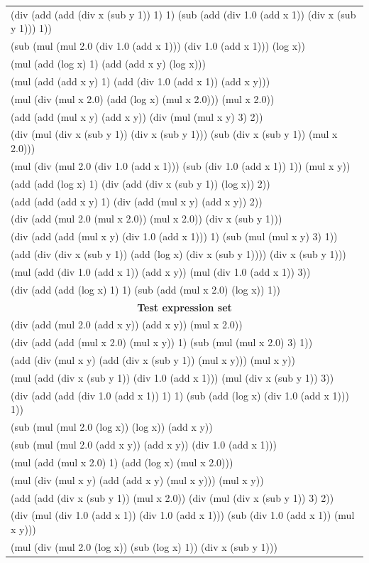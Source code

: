 \documentclass[fullpage,twocolumn]{article} %
\begin{document}
\begin{table}
\begin{tabular}{l}
(div (add (add (div x (sub y 1)) 1) 1) (sub (add (div 1.0 (add x 1)) (div x (sub y 1))) 1))  \\
(sub (mul (mul 2.0 (div 1.0 (add x 1))) (div 1.0 (add x 1))) (log x))  \\
(mul (add (log x) 1) (add (add x y) (log x)))  \\
(mul (add (add x y) 1) (add (div 1.0 (add x 1)) (add x y)))  \\
(mul (div (mul x 2.0) (add (log x) (mul x 2.0))) (mul x 2.0))  \\
(add (add (mul x y) (add x y)) (div (mul (mul x y) 3) 2))  \\
(div (mul (div x (sub y 1)) (div x (sub y 1))) (sub (div x (sub y 1)) (mul x 2.0)))  \\
(mul (div (mul 2.0 (div 1.0 (add x 1))) (sub (div 1.0 (add x 1)) 1)) (mul x y))  \\
(add (add (log x) 1) (div (add (div x (sub y 1)) (log x)) 2))  \\
(add (add (add x y) 1) (div (add (mul x y) (add x y)) 2))  \\
(div (add (mul 2.0 (mul x 2.0)) (mul x 2.0)) (div x (sub y 1)))  \\
(div (add (add (mul x y) (div 1.0 (add x 1))) 1) (sub (mul (mul x y) 3) 1))  \\
(add (div (div x (sub y 1)) (add (log x) (div x (sub y 1)))) (div x (sub y 1)))  \\
(mul (add (div 1.0 (add x 1)) (add x y)) (mul (div 1.0 (add x 1)) 3))  \\
(div (add (add (log x) 1) 1) (sub (add (mul x 2.0) (log x)) 1))  \\ \midrule
        \multicolumn{1}{c}{{\bf Test expression set}} \\ \midrule
(div (add (mul 2.0 (add x y)) (add x y)) (mul x 2.0))  \\
(div (add (add (mul x 2.0) (mul x y)) 1) (sub (mul (mul x 2.0) 3) 1))  \\
(add (div (mul x y) (add (div x (sub y 1)) (mul x y))) (mul x y))  \\
(mul (add (div x (sub y 1)) (div 1.0 (add x 1))) (mul (div x (sub y 1)) 3))  \\
(div (add (add (div 1.0 (add x 1)) 1) 1) (sub (add (log x) (div 1.0 (add x 1))) 1))  \\
(sub (mul (mul 2.0 (log x)) (log x)) (add x y))  \\
(sub (mul (mul 2.0 (add x y)) (add x y)) (div 1.0 (add x 1)))  \\
(mul (add (mul x 2.0) 1) (add (log x) (mul x 2.0)))  \\
(mul (div (mul x y) (add (add x y) (mul x y))) (mul x y))  \\
(add (add (div x (sub y 1)) (mul x 2.0)) (div (mul (div x (sub y 1)) 3) 2))  \\
(div (mul (div 1.0 (add x 1)) (div 1.0 (add x 1))) (sub (div 1.0 (add x 1)) (mul x y)))  \\
(mul (div (mul 2.0 (log x)) (sub (log x) 1)) (div x (sub y 1)))  \\
\bottomrule
  \end{tabular}
  \label{tbl:generalization-expressions}
\end{table}
\end{document}
